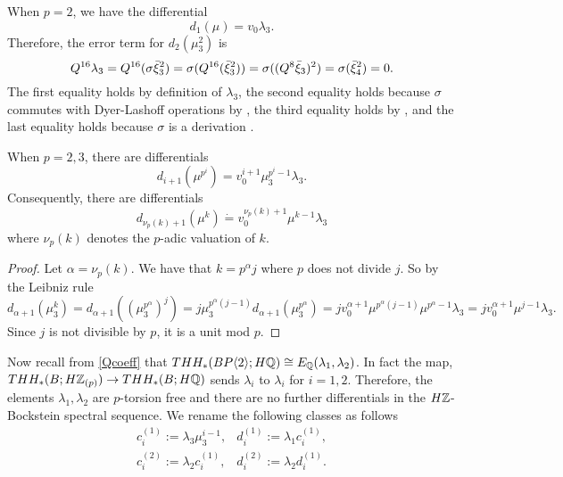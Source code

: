 When $p=2$, we have the differential 
\[
d_1(\mu)=v_0\lambda_3.
\]
Therefore, the error term for $d_2(\mu_3^2)$ is 
\[
Q^{16}\lambda_3 = Q^{16}(\sigma\bar{\xi}_3^2) = \sigma(Q^{16}(\bar{\xi}_3^2)) = \sigma((Q^8\bar{\xi}_3)^2) = \sigma(\bar{\xi}_4^2)=0.
\]
The first equality holds by definition of $\lambda_3$, the second equality holds because $\sigma$ commutes with Dyer-Lashoff operations by \cite{Bok85}, the third equality holds by \cite{BMMS86}, and the last equality holds because $\sigma$ is a derivation \cite{AngeltveitRognes}.
\begin{cor}
	When $p=2,3$, there are differentials
	\[
	d_{i+1}(\mu^{p^i}) = v_0^{i+1}\mu_3^{p^i-1}\lambda_3.
	\]
	Consequently, there are differentials
	\[
	d_{\nu_p(k)+1}(\mu^k) \dot{=}v_0^{\nu_p(k)+1}\mu^{k-1}\lambda_3
	\]
	where $\nu_p(k)$ denotes the $p$-adic valuation of $k$.
\end{cor}
\begin{proof}
	Let $\alpha=\nu_p(k)$. We have that $k=p^\alpha j$ where $p$ does not divide $j$. So by the Leibniz rule
	\[
	d_{\alpha+1}(\mu_3^{k}) = d_{\alpha+1}((\mu_3^{p^\alpha})^j) = j\mu_3^{p^{\alpha}(j-1)}d_{\alpha+1}(\mu_3^{p^{\alpha}}) = jv_0^{\alpha+1}\mu^{p^\alpha (j-1)}\mu^{p^{\alpha}-1}\lambda_3 = jv_0^{\alpha+1}\mu^{j-1}\lambda_3.
	\]
	Since $j$ is not divisible by $p$, it is a unit mod $p$.
\end{proof}
Now recall from \eqref{Qcoeff} that $THH_*(BP\langle 2 \rangle;H\mathbb{Q})\cong E_{\mathbb{Q}}(\lambda_1,\lambda_2)$. In fact the map, $THH_*(B;H\mathbb{Z}_{(p)})\to THH_*(B;H\mathbb{Q})$ sends $\lambda_i$ to $\lambda_i$ for $i=1,2$.
Therefore, the elements $\lambda_1,\lambda_2$ are $p$-torsion free and there are no further differentials in the $H\mathbb{Z}$-Bockstein spectral sequence.  We rename the following classes as follows 
\begin{equation}\label{HZgens}
	\begin{array}{cc} 
		c^{(1)}_i:=\lambda_3\mu_3^{i-1},  & d_i^{(1)}:=\lambda_1c_i^{(1)}, \\
		c_i^{(2)}:=\lambda_2c_i^{(1)}, & d_i^{(2)}:=\lambda_2d^{(1)}_i.
	\end{array}
\end{equation}


